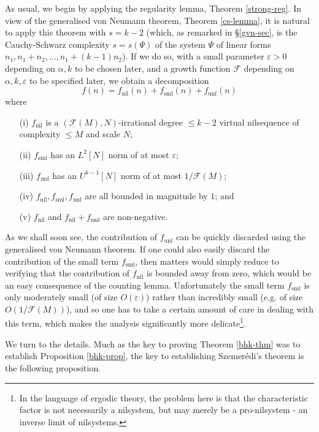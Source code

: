 \documentclass[11pt,reqno]{amsart}
\numberwithin{equation}{section}
\theoremstyle{plain}
\theoremstyle{definition}
\renewcommand{\leq}{\leqslant}
\newcommand\1{{\bf 1}}
\newcommand\2{{\bf 2}}
\newcommand\eps{\varepsilon}
\newcommand\nil{{\operatorname{nil}}}
\newcommand\sml{{\operatorname{sml}}}
\newcommand\unf{{\operatorname{unf}}}
\newcommand\Grow{{\mathcal F}}
\begin{document}
As usual, we begin by applying the regularity lemma, Theorem \ref{strong-reg}.  In view of the generalised von Neumann theorem, Theorem \ref{cs-lemma}, it is natural to apply this theorem with $s=k-2$ (which, as remarked in \S \ref{gvn-sec}, is the Cauchy-Schwarz complexity $s = s(\Psi)$ of the system $\Psi$ of  linear forms $n_1,n_1+n_2,\ldots,n_1+(k-1)n_2$).  If we do so, with a small parameter $\eps > 0$ depending on $\alpha,k$ to be chosen later, and a growth function $\Grow$ depending on $\alpha,k,\eps$ to be specified later, we obtain a decomposition
\begin{equation}\label{f-expand}
f(n) = f_{\nil}(n) + f_{\sml}(n) + f_{\unf}(n)
\end{equation}
where
\begin{itemize}
\item[(i)] $f_\nil$ is a $(\Grow(M),N)$-irrational degree $\leq k-2$ virtual nilsequence of complexity $\leq M$ and scale $N$;
\item[(ii)] $f_\sml$ has an $L^2[N]$ norm of at most $\eps$;
\item[(iii)] $f_\unf$ has an $U^{k-1}[N]$ norm of at most $1/\Grow(M)$;
\item[(iv)] $f_\nil, f_\sml, f_\unf$ are all bounded in magnitude by $1$; and
\item[(v)] $f_\nil$ and $f_\nil+f_\sml$ are non-negative.
\end{itemize}

As we shall soon see, the contribution of $f_\unf$ can be quickly discarded using the generalised von Neumann theorem.  If one could also easily discard the contribution of the small term $f_\sml$, then matters would simply reduce to verifying that the contribution of $f_\nil$ is bounded away from zero, which would be an easy consequence of the counting lemma.  Unfortunately the small term $f_\sml$ is only moderately small (of size $O(\eps)$) rather than incredibly small (e.g. of size $O(1/\Grow(M))$), and so one has to take a certain amount of care in dealing with this term, which makes the analysis significantly more delicate\footnote{In the language of ergodic theory, the problem here is that the characteristic factor is not necessarily a nilsystem, but may merely be a pro-nilsystem - an inverse limit of nilsystems.}.

We turn to the details.  
Much as the key to proving Theorem \ref{bhk-thm} was to establish Proposition \ref{bhk-prop}, the key to establishing Szemer\'edi's theorem is the following proposition.
\end{document}
